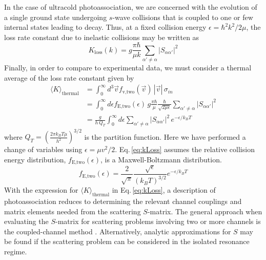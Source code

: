 In the case of ultracold photoassociation, we are concerned with the evolution of a single ground state undergoing $s$-wave collisions that is coupled to one or few internal states leading to decay.
Thus, at a fixed collision energy $\epsilon = \hbar^2 k^2 / 2\mu$, the loss rate constant due to inelastic collisions may be written as 
\begin{equation}
	K_{\text{loss}}(k) = g \frac{\pi \hbar}{\mu k} \sum_{\alpha' \neq \alpha}\vert S_{\alpha \alpha'} \vert^2
\end{equation}
Finally, in order to compare to experimental data, we must consider a thermal average of the loss rate constant given by \cite{Julienne2009, Julienne2009a, Krems2009a}
\begin{align} \label{eq:kLoss}
\nonumber
  \langle K \rangle_\text{thermal} &= \int_0^{\infty} d^3\vec{v} f_\text{v,two}(\vec{v})\,|\vec{v}|\,\sigma_{in} \\
  \nonumber
                                  &= \int_0^{\infty} d\epsilon  f_\text{E,two}(\epsilon)\, g \frac{\pi \hbar}{\mu} \frac{\hbar}{\sqrt{2 \mu \epsilon}} \sum_{\alpha' \neq \alpha}\vert S_{\alpha \alpha'} \vert^2 \\
                                  &= \frac{g}{h\,Q_{T}} \int_{0}^{\infty} d\epsilon \sum_{\alpha' \neq \alpha}\vert S_{\alpha \alpha'} \vert^2 \,e^{-\epsilon/k_{B}T}
\end{align}
where $Q_T=\left( \frac{2 \pi k_B T \mu}{h^2} \right)^{3/2}$ is the partition function.
Here we have performed a change of variables using $\epsilon = \mu v^2/2$.
Eq.\,\ref{eq:kLoss} assumes the relative collision energy distribution, $f_\text{E,two}(\epsilon)$, is a Maxwell-Boltzmann distribution.
\begin{equation}
	f_\text{E,two}(\epsilon) = \frac{2}{\sqrt{\pi}} \frac{\sqrt{\epsilon}}{(k_B T)^{3/2}} e^{-\epsilon/k_B T}
\end{equation}
With the expression for $ \langle K \rangle_\text{thermal}$ in Eq.\,\ref{eq:kLoss}, a description of photoassociation reduces to determining the relevant channel couplings and matrix elements needed from the scattering $S$-matrix.
The general approach when evaluating the $S$-matrix for scattering problems involving two or more channels is the coupled-channel method \cite{PhysRevB.38.4688,Krems2009a}.
Alternatively, analytic approximations for $S$ may be found if the scattering problem can be considered in the isolated resonance regime.
